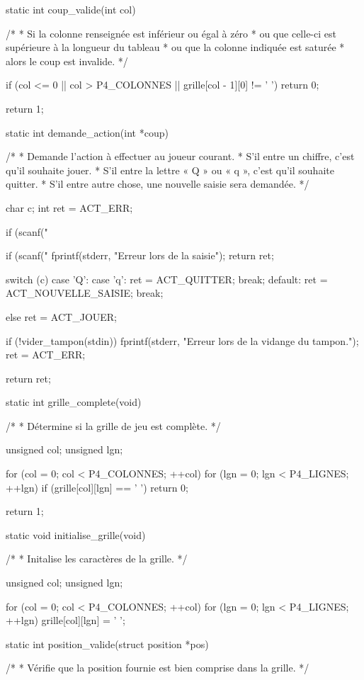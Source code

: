 \begin{C}
static int coup_valide(int col)
{
    /*
     * Si la colonne renseignée est inférieur ou égal à zéro
     * ou que celle-ci est supérieure à la longueur du tableau
     * ou que la colonne indiquée est saturée
     * alors le coup est invalide.
     */

    if (col <= 0 || col > P4_COLONNES || grille[col - 1][0] != ' ')
        return 0;

    return 1;
}


static int demande_action(int *coup)
{
    /*
     * Demande l'action à effectuer au joueur courant.
     * S'il entre un chiffre, c'est qu'il souhaite jouer.
     * S'il entre la lettre « Q » ou « q », c'est qu'il souhaite quitter.
     * S'il entre autre chose, une nouvelle saisie sera demandée.
     */

    char c;
    int ret = ACT_ERR;

    if (scanf("%
    {
        if (scanf("%
        {
            fprintf(stderr, "Erreur lors de la saisie\n");
            return ret;
        }

        switch (c)
        {
        case 'Q':
        case 'q':
            ret = ACT_QUITTER;
            break;
        default:
            ret = ACT_NOUVELLE_SAISIE;
            break;
        }
    }
    else
        ret = ACT_JOUER;

    if (!vider_tampon(stdin))
    {
         fprintf(stderr, "Erreur lors de la vidange du tampon.\n");
         ret = ACT_ERR;
    }

    return ret;
}


static int grille_complete(void)
{
    /*
     * Détermine si la grille de jeu est complète.
     */

    unsigned col;
    unsigned lgn;

    for (col = 0; col < P4_COLONNES; ++col)
        for (lgn = 0; lgn < P4_LIGNES; ++lgn)
            if (grille[col][lgn] == ' ')
                return 0;

    return 1;
}


static void initialise_grille(void)
{
    /*
     * Initalise les caractères de la grille.
     */

    unsigned col;
    unsigned lgn;

    for (col = 0; col < P4_COLONNES; ++col)
        for (lgn = 0; lgn < P4_LIGNES; ++lgn)
            grille[col][lgn] = ' ';
}


static int position_valide(struct position *pos)
{
    /*
     * Vérifie que la position fournie est bien comprise dans la grille.
     */

}
\end{C}
